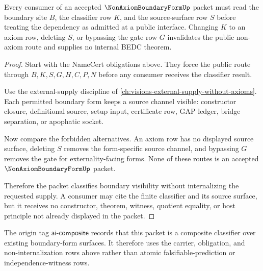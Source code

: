\begin{theorem}
\label{thm:non-axiom-boundary-form-non-internalization}
Every consumer of an accepted $\NonAxiomBoundaryFormUp$ packet must read the boundary site $B$, the classifier row $K$, and the source-surface row $S$ before treating the dependency as admitted at a public interface. Changing $K$ to an axiom row, deleting $S$, or bypassing the gate row $G$ invalidates the public non-axiom route and supplies no internal BEDC theorem.
\end{theorem}
\begin{proof}
Start with the NameCert obligations above. They force the public route through $B,K,S,G,H,C,P,N$ before any consumer receives the classifier result.

Use the external-supply discipline of \autoref{ch:visions-external-supply-without-axioms}. Each permitted boundary form keeps a source channel visible: constructor closure, definitional source, setup input, certificate row, GAP ledger, bridge separation, or apophatic socket.

Now compare the forbidden alternatives. An axiom row has no displayed source surface, deleting $S$ removes the form-specific source channel, and bypassing $G$ removes the gate for externality-facing forms. None of these routes is an accepted $\NonAxiomBoundaryFormUp$ packet.

Therefore the packet classifies boundary visibility without internalizing the requested supply. A consumer may cite the finite classifier and its source surface, but it receives no constructor, theorem, witness, quotient equality, or host principle not already displayed in the packet.
\end{proof}

The origin tag $\mathsf{ai\mbox{-}composite}$ records that this packet is a composite classifier over existing boundary-form surfaces. It therefore uses the carrier, obligation, and non-internalization rows above rather than atomic falsifiable-prediction or independence-witness rows.


